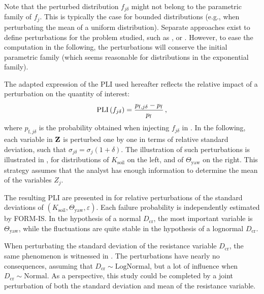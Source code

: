 Note that the perturbed distribution $f_{j \delta}$ might not belong to the parametric family of $f_j$. 
This is typically the case for bounded distributions (e.g., when perturbating the mean of a uniform distribution). 
Separate approaches exist to define perturbations for the problem studied, such as \citet{lemaitre_2015_PLI}, or \citet{gauchy_2022_PLI}. 
However, to ease the computation in the following, the perturbations will conserve the initial parametric family (which seems reasonable for distributions in the exponential family). 

The adapted expression of the PLI used hereafter \citep{gauchy_2022_PLI} reflects the relative impact of a perturbation on the quantity of interest: 
\begin{equation}
    \mathrm{PLI}\left(f_{j \delta}\right) = \frac{p_{\mathrm{f}, j \delta} - p_\mathrm{f} }{p_\mathrm{f}} \,,
\end{equation}
where $p_{\mathrm{f}, j \delta}$ is the probability obtained when injecting $f_{j \delta}$ in .
In the following, each variable in ${\bf Z}$ is perturbed one by one in terms of relative standard deviation, such that $\sigma_{j \delta} = \sigma_j (1+\delta)$. 
The illustration of such perturbations is illustrated in , for distributions of $K_{\mathrm{soil}}$ on the left, and of $\Theta_{\mathrm{yaw}}$ on the right.
This strategy assumes that the analyst has enough information to determine the mean of the variables $Z_j$. 

The resulting PLI are presented in  for relative perturbations of the standard deviations of $(K_{\mathrm{soil}}, \Theta_{\mathrm{yaw}}, \varepsilon)$. 
Each failure probability is independently estimated by FORM-IS. 
In the hypothesis of a normal $D_{\mathrm{cr}}$, the most important variable is $\Theta_{\mathrm{yaw}}$, while the fluctuations are quite stable in the hypothesis of a lognormal $D_{\mathrm{cr}}$. 

When perturbating the standard deviation of the resistance variable $D_{\mathrm{cr}}$, the same phenomenon is witnessed in . 
The perturbations have nearly no consequences, assuming that $D_{\mathrm{cr}}\sim \mathrm{LogNormal}$, but a lot of influence when $D_{\mathrm{cr}}\sim \mathrm{Normal}$.  
As a perspective, this study could be completed by a joint perturbation of both the standard deviation and mean of the resistance variable.


